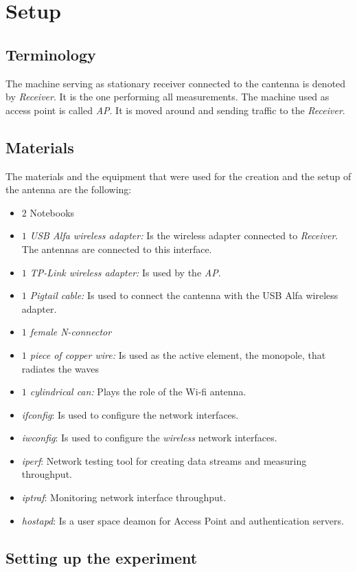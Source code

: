 \documentclass[12pt,a4paper]{article}
\newcommand{\rc}[0]{\emph{Receiver}}
\newcommand{\ap}[0]{\emph{AP}}
\begin{document}
\section{Setup}	
	
	\subsection{Terminology}
		The machine serving as stationary receiver connected to the cantenna is denoted by \rc. It is the one performing all measurements. The machine used as access point is called \ap. It is moved around and sending traffic to the \rc.
	
	\subsection{Materials}
		The materials and the equipment that were used for the creation and the setup of the antenna are the following: 
		\begin{itemize}
			\item $2$ Notebooks
			\item {\emph{$1$ USB Alfa wireless adapter:} Is the wireless adapter connected to \rc. The antennas are connected to this interface.} 
			\item {\emph{$1$ TP-Link wireless adapter:} Is used by the \ap.}
			\item {\emph{$1$ Pigtail cable:} Is used to connect the cantenna with the USB Alfa wireless adapter.}
			\item {\emph{$1$ female N-connector}}
			\item {\emph{$1$ piece of copper wire:} Is used as the active element, the monopole, that radiates the waves}
			\item {\emph{$1$ cylindrical can:} Plays the role of the Wi-fi antenna.} 
			\item \emph{ifconfig}: Is used to configure the network interfaces.
			\item \emph{iwconfig}: Is used to configure the \emph{wireless} network interfaces.
			\item \emph{iperf}: Network testing tool for creating data streams and measuring throughput.
			\item \emph{iptraf}: Monitoring network interface throughput.
			\item \emph{hostapd}: Is a user space deamon for Access Point and authentication servers.
		\end{itemize}
	
	\subsection{Setting up the experiment}
\end{document}
